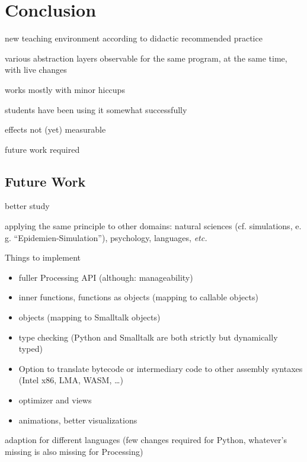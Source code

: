 
\chapter{Conclusion} \label{ch_conclusion}

\begin{todo}
\item new teaching environment according to didactic recommended practice
\item various abstraction layers observable for the same program, at the same time, with live changes
\item works mostly with minor hiccups
\item students have been using it somewhat successfully
\item effects not (yet) measurable
\item future work required
\end{todo}


\section{Future Work} \label{sc_future}

\begin{todo}
\item better study
\item applying the same principle to other domains: natural sciences (cf. simulations, e.\,g. ``Epidemien-Simulation''), psychology, languages, \emph{etc.}
\item Things to implement
\begin{itemize}
\item fuller Processing API (although: manageability)
\item inner functions, functions as objects (mapping to callable objects)
\item objects (mapping to Smalltalk objects)
\item type checking (Python and Smalltalk are both strictly but dynamically typed)
\item Option to translate bytecode or intermediary code to other assembly syntaxes (Intel x86, LMA, WASM, \dots)
\item optimizer and views
\item animations, better visualizations
\end{itemize}
\item adaption for different languages (few changes required for Python, whatever's missing is also missing for Processing)
\end{todo}
